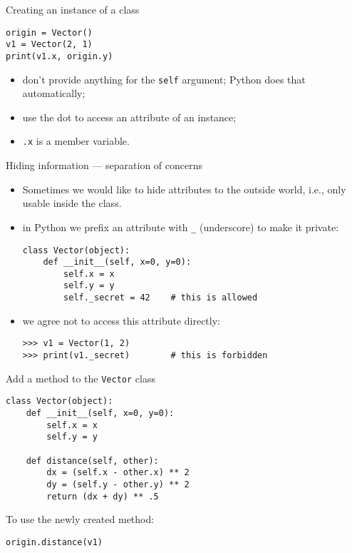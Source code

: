 \documentclass{beamer}
\begin{document}
\begin{frame}[fragile]{Creating an instance of a class}
\begin{verbatim}
origin = Vector()
v1 = Vector(2, 1)
print(v1.x, origin.y)
\end{verbatim}

\bigskip

\begin{itemize}
\item don't provide anything for the \texttt{self} argument;
Python does that automatically;
\item use the \textcolor{pms280_compl}{dot} to access an attribute of an
instance;
\item \texttt{.x} is a member variable.
\end{itemize}
\end{frame}

\begin{frame}[fragile]{Hiding information --- separation of concerns}
\begin{itemize}
\item Sometimes we would like to \textcolor{pms280_compl}{hide}
attributes to the outside world, i.e., only usable inside the class.

\item in Python we prefix an attribute with \texttt{_}
(underscore) to make it \textcolor{pms280_compl}{private}:
\begin{verbatim}
class Vector(object):
    def __init__(self, x=0, y=0):
        self.x = x
        self.y = y
        self._secret = 42    # this is allowed
\end{verbatim}

\item we agree not to access this attribute directly:
\begin{verbatim}
>>> v1 = Vector(1, 2)
>>> print(v1._secret)        # this is forbidden
\end{verbatim}

\end{itemize}
\end{frame}

\begin{frame}[fragile]{Add a method to the \texttt{Vector} class}
\begin{verbatim}
class Vector(object):
    def __init__(self, x=0, y=0):
        self.x = x
        self.y = y

    def distance(self, other):
        dx = (self.x - other.x) ** 2
        dy = (self.y - other.y) ** 2
        return (dx + dy) ** .5
\end{verbatim}

\bigskip

To use the newly created method:
\begin{verbatim}
origin.distance(v1)
\end{verbatim}
\end{frame}
\end{document}
